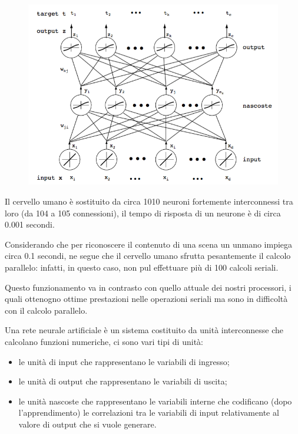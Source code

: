 \begin{figure}[htbp]
\centering
\includegraphics{./notes/immagini/l9-rete.png}
\caption{}
\end{figure}

Il cervello umano è sostituito da circa 1010 neuroni fortemente
interconnessi tra loro (da 104 a 105 connessioni), il tempo di risposta
di un neurone è di circa 0.001 secondi.

Considerando che per riconoscere il contenuto di una scena un unmano
impiega circa 0.1 secondi, ne segue che il cervello umano sfrutta
pesantemente il calcolo parallelo: infatti, in questo caso, non pul
effettuare più di 100 calcoli seriali.

Questo funzionamento va in contrasto con quello attuale dei nostri
processori, i quali ottenogno ottime prestazioni nelle operazioni
seriali ma sono in difficoltà con il calcolo parallelo.

Una rete neurale artificiale è un sistema costituito da unità
interconnesse che calcolano funzioni numeriche, ci sono vari tipi di
unità:

\begin{itemize}

\item
  le unità di input che rappresentano le variabili di ingresso;
\item
  le unità di output che rappresentano le variabili di uscita;
\item
  le unità nascoste che rappresentano le variabili interne che
  codificano (dopo l'apprendimento) le correlazioni tra le variabili di
  input relativamente al valore di output che si vuole generare.
\end{itemize}

